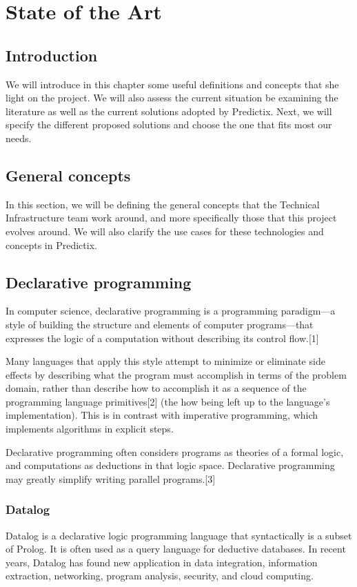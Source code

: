 \chapter{State of the Art}


\section*{Introduction}
We will introduce in this chapter some useful definitions and concepts that she
light on  the project. We will also assess the current situation be examining
the literature as well as the current solutions adopted by Predictix. Next, we
will specify the different proposed solutions and choose the one that fits most
our needs.
\pagebreak

\section{General concepts}

In this section, we will be defining the general concepts that the Technical
Infrastructure team work around, and more specifically those that this project
evolves around. We will also clarify the use cases for these technologies and
concepts in Predictix.

\section{Declarative programming}
In computer science, declarative programming is a programming paradigm—a style
of building the structure and elements of computer programs—that expresses the
logic of a computation without describing its control flow.[1]

Many languages that apply this style attempt to minimize or eliminate side
effects by describing what the program must accomplish in terms of the problem
domain, rather than describe how to accomplish it as a sequence of the
programming language primitives[2] (the how being left up to the language's
implementation). This is in contrast with imperative programming, which
implements algorithms in explicit steps.

Declarative programming often considers programs as theories of a formal logic,
and computations as deductions in that logic space. Declarative programming may
greatly simplify writing parallel programs.[3]

\subsection{Datalog}
Datalog is a declarative logic programming language that syntactically is a
subset of Prolog. It is often used as a query language for deductive databases.
In recent years, Datalog has found new application in data integration,
information extraction, networking, program analysis, security, and cloud
computing.

